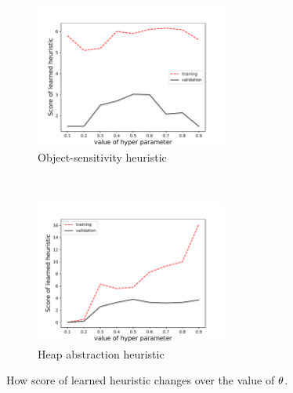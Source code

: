 \begin{figure}
	\centering
	\begin{multicols}{2}
	\begin{subfigure}[t]{1.\columnwidth}
	\centering
	\includegraphics[width=6.3cm]{Graphick/figures/ctx_gamma.pdf}
	\caption{Object-sensitivity heuristic}
	\end{subfigure}
~\columnbreak

	\begin{subfigure}[t]{1.\columnwidth}
	\centering	
	\includegraphics[width=6.3cm]{Graphick/figures/heap_gamma.pdf}
	\caption{Heap abstraction heuristic}
	\end{subfigure}
	\end{multicols}
	\caption{How score of learned heuristic changes over the value of ${\theta}$.}
	\label{fig:gamma}
\end{figure}


\label{sec:hyper_param}

